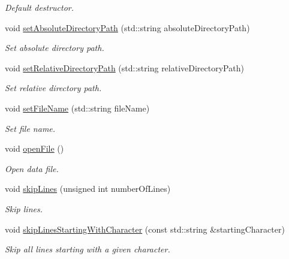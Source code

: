 \begin{DoxyCompactItemize}
\begin{DoxyCompactList}\small\item\em Default destructor. \end{DoxyCompactList}\item 
void \hyperlink{classtudat_1_1input__output_1_1TwoLineElementsTextFileReader_a113b8d1ec324f8dcaa9dd50de8ecfd68}{set\+Absolute\+Directory\+Path} (std\+::string absolute\+Directory\+Path)
\begin{DoxyCompactList}\small\item\em Set absolute directory path. \end{DoxyCompactList}\item 
void \hyperlink{classtudat_1_1input__output_1_1TwoLineElementsTextFileReader_a9648782cf134cbfa44f982561f397461}{set\+Relative\+Directory\+Path} (std\+::string relative\+Directory\+Path)
\begin{DoxyCompactList}\small\item\em Set relative directory path. \end{DoxyCompactList}\item 
void \hyperlink{classtudat_1_1input__output_1_1TwoLineElementsTextFileReader_a22242492fa8b6c35821d9313a149f82a}{set\+File\+Name} (std\+::string file\+Name)
\begin{DoxyCompactList}\small\item\em Set file name. \end{DoxyCompactList}\item 
void \hyperlink{classtudat_1_1input__output_1_1TwoLineElementsTextFileReader_ac94cbf206aceb7b496983847659b225f}{open\+File} ()
\begin{DoxyCompactList}\small\item\em Open data file. \end{DoxyCompactList}\item 
void \hyperlink{classtudat_1_1input__output_1_1TwoLineElementsTextFileReader_a8ecbbacdf33c759024a5e374cfff40ed}{skip\+Lines} (unsigned int number\+Of\+Lines)
\begin{DoxyCompactList}\small\item\em Skip lines. \end{DoxyCompactList}\item 
void \hyperlink{classtudat_1_1input__output_1_1TwoLineElementsTextFileReader_ad9055afcba240a201cb2fd53b1d80fe9}{skip\+Lines\+Starting\+With\+Character} (const std\+::string \&starting\+Character)
\begin{DoxyCompactList}\small\item\em Skip all lines starting with a given character. \end{DoxyCompactList}\item 

\end{DoxyCompactItemize}
